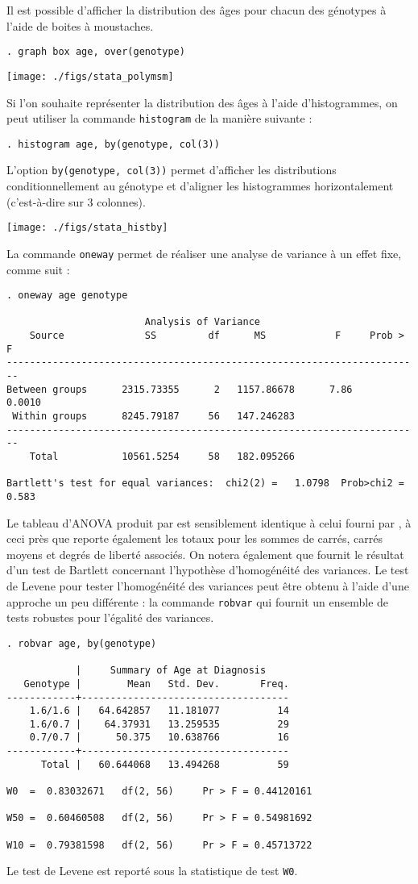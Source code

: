 Il est possible d'afficher la distribution des âges pour chacun des
génotypes à l'aide de boites à moustaches.
\begin{verbatim}
. graph box age, over(genotype)
\end{verbatim}

\texttt{[image: ./figs/stata\_polymsm]}

Si l'on souhaite représenter la distribution des âges à l'aide
d'histogrammes, on peut utiliser la commande \texttt{histogram} de la
manière suivante :
\begin{verbatim}
. histogram age, by(genotype, col(3))
\end{verbatim}
L'option \verb|by(genotype, col(3))| permet d'afficher les distributions
conditionnellement au génotype et d'aligner les histogrammes horizontalement
(c'est-à-dire sur 3 colonnes).

\texttt{[image: ./figs/stata\_histby]}

La commande \texttt{oneway} permet de réaliser une analyse de variance à un
effet fixe, comme suit :
\begin{verbatim}
. oneway age genotype

                        Analysis of Variance
    Source              SS         df      MS            F     Prob > F
------------------------------------------------------------------------
Between groups      2315.73355      2   1157.86678      7.86     0.0010
 Within groups      8245.79187     56   147.246283
------------------------------------------------------------------------
    Total           10561.5254     58   182.095266

Bartlett's test for equal variances:  chi2(2) =   1.0798  Prob>chi2 = 0.583
\end{verbatim}
Le tableau d'ANOVA produit par \Stata est sensiblement identique à celui
fourni par \R, à ceci près que \Stata reporte également les totaux pour les
sommes de carrés, carrés moyens et degrés de liberté associés. On notera
également que \Stata fournit le résultat d'un test de Bartlett concernant
l'hypothèse d'homogénéité des variances. Le test de Levene pour tester
l'homogénéité des variances peut être obtenu à l'aide d'une approche un peu
différente : la commande \verb|robvar| qui fournit un ensemble de tests
robustes pour l'égalité des variances.
\begin{verbatim}
. robvar age, by(genotype)

            |     Summary of Age at Diagnosis
   Genotype |        Mean   Std. Dev.       Freq.
------------+------------------------------------
    1.6/1.6 |   64.642857   11.181077          14
    1.6/0.7 |    64.37931   13.259535          29
    0.7/0.7 |      50.375   10.638766          16
------------+------------------------------------
      Total |   60.644068   13.494268          59

W0  =  0.83032671   df(2, 56)     Pr > F = 0.44120161

W50 =  0.60460508   df(2, 56)     Pr > F = 0.54981692

W10 =  0.79381598   df(2, 56)     Pr > F = 0.45713722
\end{verbatim}
Le test de Levene est reporté sous la statistique de test \texttt{W0}.

